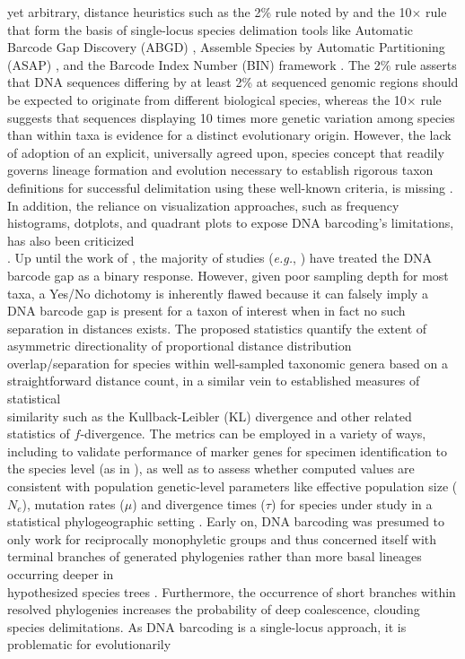 \documentclass[12pt]{article}
\begin{document}
yet arbitrary, distance heuristics such as the 2\% rule noted by \citet{hebert2003biological} and the 10$\times$ rule \citep{hebert2004identification} that form the basis of single-locus species delimation tools like Automatic Barcode Gap Discovery (ABGD) \citep{puillandre2011abgd}, Assemble Species by Automatic Partitioning (ASAP) \citep{puillandre2021asap}, and the Barcode Index Number (BIN) framework \citep{ratnasingham2013bin}. The 2\% rule asserts that DNA sequences differing by at least 2\% at sequenced genomic regions should be expected to originate from different biological species, whereas the 10$\times$ rule suggests that sequences displaying 10 times more genetic variation among species than within taxa is evidence for a distinct evolutionary origin. However, the lack of adoption of an explicit, universally agreed upon, species concept that readily governs lineage formation and evolution necessary to establish rigorous taxon definitions for successful delimitation using these well-known criteria, is missing \citep{rannala2015art}. In addition, the reliance on visualization approaches, such as frequency histograms, dotplots, and quadrant plots to expose DNA barcoding's limitations, has also been criticized \\ \citep{collins2013seven, phillips2022lack}. Up until the work of \cite{phillips2024measure}, the majority of studies (\textit{e.g.}, \citet{young2021macer}) have treated the DNA barcode gap as a binary response. However, given poor sampling depth for most taxa, a Yes/No dichotomy is inherently flawed because it can falsely imply a DNA barcode gap is present for a taxon of interest when in fact no such separation in distances exists. The proposed statistics quantify the extent of asymmetric directionality of proportional distance distribution \\ overlap/separation for species within well-sampled taxonomic genera based on a \\ straightforward distance count, in a similar vein to established measures of statistical \\ similarity such as the Kullback-Leibler (KL) divergence \citep{kullback1951information} and other related statistics of $f$-divergence. The metrics can be employed in a variety of ways, including to validate performance of marker genes for specimen identification to the species level (as in \citet{phillips2024measure}), as well as to assess whether computed values are consistent with population genetic-level parameters like effective population size ($N_e$), mutation rates ($\mu$) and divergence times ($\tau$) for species under study in a statistical phylogeographic setting \citep{knowles2002statistical, mather2019practical}. Early on, DNA barcoding was presumed to only work for reciprocally monophyletic groups and thus concerned itself with terminal branches of generated phylogenies rather than more basal lineages occurring deeper in \\ hypothesized species trees \citep{mutanen2016species}. Furthermore, the occurrence of short branches within resolved phylogenies increases the probability of deep coalescence, clouding species delimitations. As DNA barcoding is a single-locus approach, it is problematic for evolutionarily 
\end{document}
